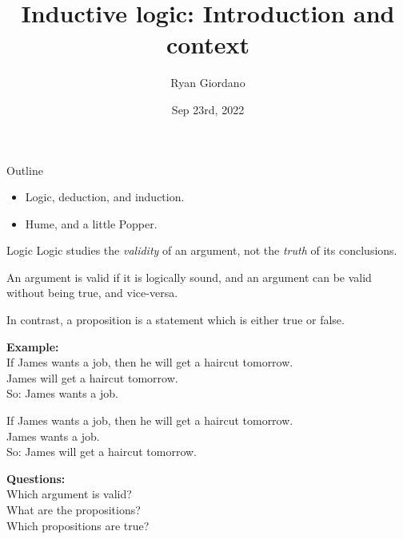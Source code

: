 \documentclass[8pt]{beamer}\usepackage[]{graphicx}\usepackage[]{color}
\title{Inductive logic: Introduction and context}
\author{Ryan Giordano}
\date{Sep 23rd, 2022}
\institute{Massachusetts Institute of Technology}
\begin{document}

\begin{frame}{Outline}
%
\begin{itemize}
%
\item Logic, deduction, and induction.
\item Hume, and a little Popper.
%
\end{itemize}
%
\end{frame}


\begin{frame}{Logic}
%
Logic studies the {\em validity} of an argument, not the {\em truth} of
its conclusions.

An argument is valid if it is logically sound, and an argument can
be valid without being true, and vice-versa.

In contrast, a proposition is a statement which is either true or false.

\vspace{1em}
\textbf{Example: }\\
If James wants a job, then he will get a haircut tomorrow.\\
James will get a haircut tomorrow.\\
So: James wants a job.

\vspace{1em}
If James wants a job, then he will get a haircut tomorrow.\\
James wants a job.\\
So: James will get a haircut tomorrow.

\pause
\vspace{1em}
\textbf{Questions:} \\
Which argument is valid?  \\
What are the propositions?\\
Which propositions are true?
%
\end{frame}



\end{document}
